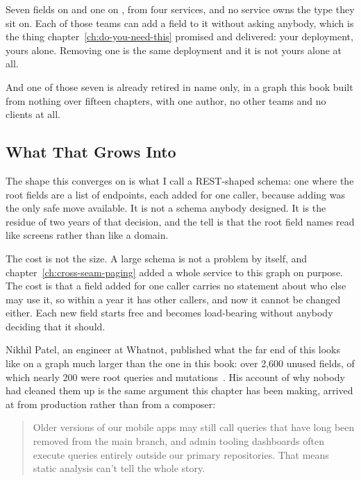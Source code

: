 %
Seven fields on  and one on , from four services,
and no service owns the type they sit on. Each of those teams can add a field
to it without asking anybody, which is the thing
chapter~\ref{ch:do-you-need-this} promised and delivered: your deployment,
yours alone. Removing one is the same deployment and it is not yours alone at
all.

%
And one of those seven is already retired in name only, in a graph this book
built from nothing over fifteen chapters, with one author, no other teams and
no clients at all.

\subsection{What That Grows Into}

%
The shape this converges on is what I call a REST-shaped schema: one where the
root fields are a list of endpoints, each added for one caller, because adding
was the only safe move available. It is not a schema anybody designed. It is
the residue of two years of that decision, and the tell is that the root field
names read like screens rather than like a domain.

%
The cost is not the size. A large schema is not a problem by itself, and
chapter~\ref{ch:cross-seam-paging} added a whole service to this graph on
purpose. The cost is that a field added for one caller carries no statement
about who else may use it, so within a year it has other callers, and now it
cannot be changed either. Each new field starts free and becomes load-bearing
without anybody deciding that it should.

%
Nikhil Patel, an engineer at Whatnot, published what the far end of this looks
like on a graph much larger than the one in this book: over 2,600 unused
fields, of which nearly 200 were root queries and
mutations~\autocite{patel2025bloat}. His account of why nobody had cleaned
them up is the same argument this chapter has been making, arrived at from
production rather than from a composer:

\begin{quote}
Older versions of our mobile apps may still call queries that have long been
removed from the main branch, and admin tooling dashboards often execute
queries entirely outside our primary repositories. That means static analysis
can't tell the whole story.
\end{quote}


